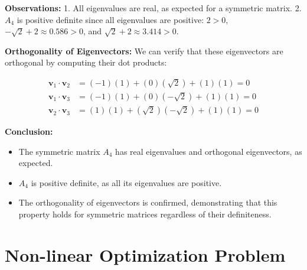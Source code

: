\documentclass{article}
\begin{document}
\begin{enumerate}
\begin{enumerate}
    \textbf{Observations:}
    1. All eigenvalues are real, as expected for a symmetric matrix.
    2. $A_4$ is positive definite since all eigenvalues are positive:
       $2 > 0$, $-\sqrt{2} + 2 \approx 0.586 > 0$, and $\sqrt{2} + 2 \approx 3.414 > 0$.

    \textbf{Orthogonality of Eigenvectors:}
    We can verify that these eigenvectors are orthogonal by computing their dot products:

    \begin{align*}
    \mathbf{v}_1 \cdot \mathbf{v}_2 &= (-1)(1) + (0)(\sqrt{2}) + (1)(1) = 0 \\
    \mathbf{v}_1 \cdot \mathbf{v}_3 &= (-1)(1) + (0)(-\sqrt{2}) + (1)(1) = 0 \\
    \mathbf{v}_2 \cdot \mathbf{v}_3 &= (1)(1) + (\sqrt{2})(-\sqrt{2}) + (1)(1) = 0
    \end{align*}

    \textbf{Conclusion:}
    \begin{itemize}
    \item The symmetric matrix $A_4$ has real eigenvalues and orthogonal eigenvectors, as expected.
    \item $A_4$ is positive definite, as all its eigenvalues are positive.
    \item The orthogonality of eigenvectors is confirmed, demonstrating that this property holds for symmetric matrices regardless of their definiteness.
    \end{itemize}

    \end{enumerate}
\end{enumerate}

\section{Non-linear Optimization Problem}
\end{document}
